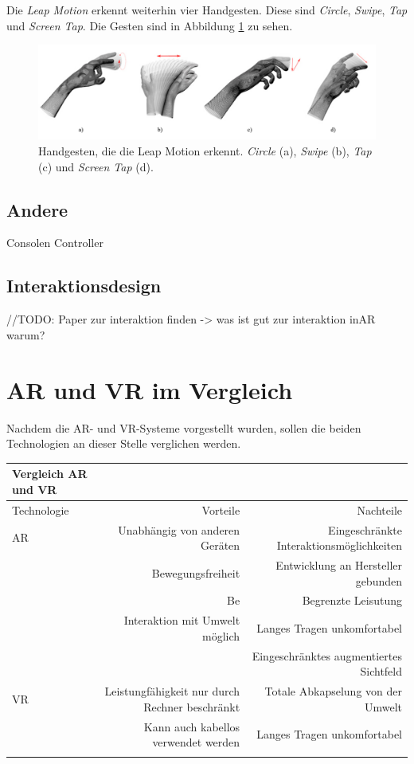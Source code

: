 Die \textit{Leap Motion} erkennt weiterhin vier Handgesten. Diese sind \textit{Circle}, \textit{Swipe}, \textit{Tap} und \textit{Screen Tap}. Die Gesten sind in Abbildung \ref{img:motionGestures} zu sehen. 

\begin{figure}
	\centering
	\includegraphics[width=0.7\linewidth]{images/motionGesture.pdf}
	\caption{Handgesten, die die Leap Motion erkennt. \textit{Circle} (a), \textit{Swipe} (b), \textit{Tap} (c) und \textit{Screen Tap} (d).}
	\label{img:motionGestures}
\end{figure}


\subsection{Andere}
Consolen Controller
\subsection{Interaktionsdesign}

//TODO:
Paper zur interaktion finden
-> was ist gut zur interaktion inAR warum?

\section{AR und VR im Vergleich}

Nachdem die AR- und VR-Systeme vorgestellt wurden, sollen die beiden Technologien an dieser Stelle verglichen werden.

\begin{tabular}{lrr} 
\toprule
Vergleich AR und VR\\  
\midrule 
Technologie & Vorteile & Nachteile\\ 
\midrule 
AR & Unabhängig von anderen Geräten & Eingeschränkte Interaktionsmöglichkeiten\\
   & Bewegungsfreiheit				& Entwicklung an Hersteller gebunden\\
   & Be								& Begrenzte Leisutung\\
   & Interaktion mit Umwelt möglich & Langes Tragen unkomfortabel\\
   & 								& Eingeschränktes augmentiertes Sichtfeld\\
VR & Leistungfähigkeit nur durch Rechner beschränkt  & Totale Abkapselung von der Umwelt \\
	& Kann auch kabellos verwendet werden		  	 & Langes Tragen unkomfortabel\\
	& & \\
\bottomrule
\end{tabular}






